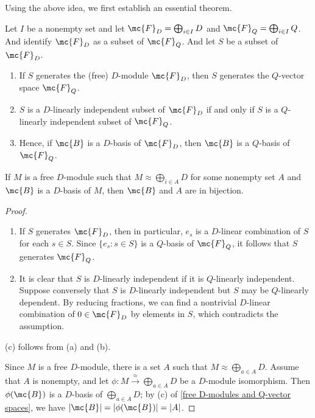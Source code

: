 Using the above idea, we first establish an essential theorem.
\begin{thm}\label{free D-modules and Q-vector spaces}
    Let $I$ be a nonempty set and let $\mc{F}_D=\bigoplus_{i\in I} D$ and $\mc{F}_Q=\bigoplus_{i\in I} Q$.
    And identify $\mc{F}_D$ as a subset of $\mc{F}_Q$.
    And let $S$ be a subset of $\mc{F}_D$.
    \begin{enumerate}
        \item[(a)]
        {
            If $S$ generates the (free) $D$-module $\mc{F}_D$, then $S$ generates the $Q$-vector space $\mc{F}_Q$.
        }
        \item[(b)]
        {
            $S$ is a $D$-linearly independent subset of $\mc{F}_D$ if and only if $S$ is a $Q$-linearly independent subset of $\mc{F}_Q$.
        }
        \item[(c)]
        {
            Hence, if $\mc{B}$ is a $D$-basis of $\mc{F}_D$, then $\mc{B}$ is a $Q$-basis of $\mc{F}_Q$.
        }
    \end{enumerate}

    If $M$ is a free $D$-module such that $M\approx\bigoplus_{i\in A} D$ for some nonempty set $A$ and $\mc{B}$ is a $D$-basis of $M$, then $\mc{B}$ and $A$ are in bijection.
\end{thm}
\begin{proof}
    \begin{enumerate}
        \item[(a)]
        {
            If $S$ generates $\mc{F}_D$, then in particular, $e_s$ is a $D$-linear combination of $S$ for each $s\in S$.
            Since $\{e_s: s\in S\}$ is a $Q$-basis of $\mc{F}_Q$, it follows that $S$ generates $\mc{F}_Q$.
        }
        \item[(b)]
        {
            It is clear that $S$ is $D$-linearly independent if it is $Q$-linearly independent.
            Suppose conversely that $S$ is $D$-linearly independent but $S$ may be $Q$-linearly dependent.
            By reducing fractions, we can find a nontrivial $D$-linear combination of $0\in\mc{F}_D$ by elements in $S$, which contradicts the assumption.
        }
    \end{enumerate}
    (c) follows from (a) and (b).

    Since $M$ is a free $D$-module, there is a set $A$ such that $M\approx\bigoplus_{a\in A} D$.
    Assume that $A$ is nonempty, and let $\phi: M\xrightarrow{\approx}\bigoplus_{a\in A}D$ be a $D$-module isomorphism.
    Then $\phi(\mc{B})$ is a $D$-basis of $\bigoplus_{a\in A} D$; by (c) of \cref{free D-modules and Q-vector spaces}, we have $|\mc{B}|=|\phi(\mc{B})|=|A|$.
\end{proof}
